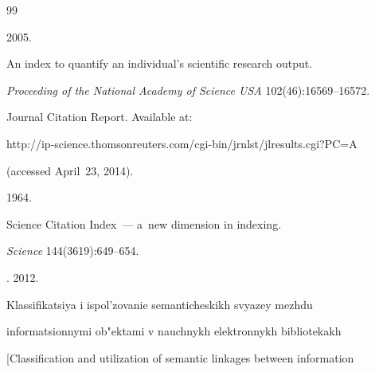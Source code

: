 



















\renewcommand{\bibname}{\protect\rmfamily References}





{\small\frenchspacing


{%




\begin{thebibliography}{99}







 2005.


An index to quantify an individual's scientific research output.


\textit{Proceeding of the National Academy of Science USA}  102(46):16569--16572.




Journal Citation Report.  Available at:


{\sf http://ip-science.thomsonreuters.com/cgi-bin/jrnlst/jlresults.cgi?PC=A}


(accessed April~23, 2014).




  1964.


{Science Citation Index~--- a~new dimension in indexing}.


\textit{Science} 144(3619):649--654.




.  2012.


Klassifikatsiya i ispol'zovanie semanticheskikh svyazey mezhdu


informatsionnymi ob"ektami v nauchnykh elektronnykh bibliotekakh


[Classification and utilization of semantic linkages between information



\end{thebibliography}}}
